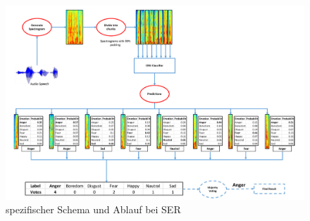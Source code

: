 \begin{figure}[ht]
	\centering
	\includegraphics[width=1\textwidth]{images/ablauf}
	\caption{\label{ablauf}spezifischer Schema und Ablauf bei SER \cite{badshah2019deep}}
\end{figure}




